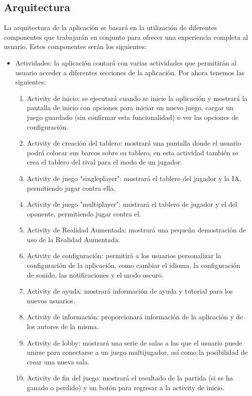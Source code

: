 \documentclass[a4paper, openright, 12pt]{article}
\begin{document}
\subsection{Arquitectura}
La arquitectura de la aplicación se basará en la utilización de diferentes componentes que trabajarán en conjunto para ofrecer una experiencia completa al usuario. Estos componentes serán los siguientes:
\begin{itemize}
    \item Actividades: la aplicación contará con varias actividades que permitirán al usuario acceder a diferentes secciones de la aplicación. Por ahora tenemos las siguientes:
        \begin{enumerate}
            \item Activity de inicio: se ejecutará cuando se inicie la aplicación y mostrará la pantalla de inicio con opciones para iniciar un nuevo juego, cargar un juego guardado (sin confirmar esta funcionalidad) o ver las opciones de configuración.
            \item Activity de creación del tablero: mostrará una pantalla donde el usuario podrá colocar sus barcos sobre su tablero, en esta actividad también se crea el tablero del rival para el modo de un jugador.
            \item Activity de juego "singleplayer": mostrará el tablero del jugador y la IA, permitiendo jugar contra ella.
            \item Activity de juego "multiplayer": mostrará el tablero de jugador y el del oponente, permitiendo jugar contra el.
            \item Activity de Realidad Aumentada: mostrará una pequeña demostración de uso de la Realidad Aumentada.
            \item Activity de configuración: permitirá a los usuarios personalizar la configuración de la aplicación, como cambiar el idioma, la configuración de sonido, las notificaciones y el modo oscuro.
            \item Activity de ayuda: mostrará información de ayuda y tutorial para los nuevos usuarios.
            \item Activity de información: proporcionará información de la aplicación y de los autores de la misma.
            \item Activity de lobby: mostrará una serie de salas a las que el usuario puede unirse para conectarse a un juego multijugador, así como la posibilidad de crear una nueva sala.
            \item Activity de fin del juego: mostrará el resultado de la partida (si se ha ganado o perdido) y un botón para regresar a la activity de inicio.

\end{enumerate}
\end{itemize}
\end{document}
